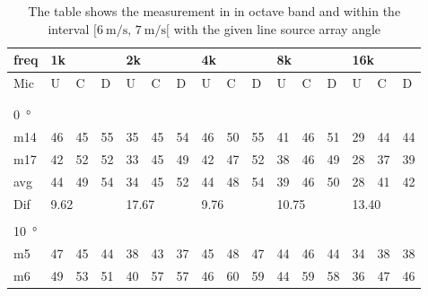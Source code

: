 \begin{table}[H]
\centering
\caption{The table shows the measurement in in octave band and within the interval $[\SI{6}{\meter\per\second},\, \SI{7}{\meter\per\second}[ $ with the given line source array angle}
\begin{tabular}{l|l|l|l|l|l|l|l|l|l|l|l|l|lll}
freq & \multicolumn{3}{l|}{1k} & \multicolumn{3}{l|}{2k} & \multicolumn{3}{l|}{4k} & \multicolumn{3}{l|}{8k} & \multicolumn{3}{l}{16k}                                \\ \hline
Mic  & U      & C      & D     & U      & C      & D     & U      & C      & D     & U      & C      & D     & \multicolumn{1}{l|}{U}  & \multicolumn{1}{l|}{C}  & D  \\ \hline
 & \multicolumn{3}{l|}{} & \multicolumn{3}{l|}{} & \multicolumn{3}{l|}{} & \multicolumn{3}{l|}{} & \multicolumn{3}{l}{}                                \\ 
 \multicolumn{16}{l}{ } \\   
\SI{0}{\degree}   & \multicolumn{3}{l|}{} & \multicolumn{3}{l|}{} & \multicolumn{3}{l|}{} & \multicolumn{3}{l|}{} & \multicolumn{3}{l}{}   \\  \hline
m14  & 46     & 45     & 55    & 35     & 45     & 54    & 46     & 50     & 55    & 41     & 46     & 51    & \multicolumn{1}{l|}{29} & \multicolumn{1}{l|}{44} & 44 \\
m17  & 42     & 52     & 52    & 33     & 45     & 49    & 42     & 47     & 52    & 38     & 46     & 49    & \multicolumn{1}{l|}{28} & \multicolumn{1}{l|}{37} & 39 \\ \hline
avg  &   44    &   49   & 54    &  34    &  45    &  52  &   44     &  48   &   54  &  39    & 46    &  50     & \multicolumn{1}{l|}{28}   & \multicolumn{1}{l|}{41}   & 42 \\ \hline  
Dif & \multicolumn{3}{l|}{9.62} & \multicolumn{3}{l|}{17.67} & \multicolumn{3}{l|}{9.76} & \multicolumn{3}{l|}{10.75} & \multicolumn{3}{l}{13.40}  \\ 
 \multicolumn{16}{l}{ } \\                             
\SI{10}{\degree}   & \multicolumn{3}{l|}{} & \multicolumn{3}{l|}{} & \multicolumn{3}{l|}{} & \multicolumn{3}{l|}{} & \multicolumn{3}{l}{}   \\  \hline
m5    & 47     & 45     & 44     &  38    & 43     &  37    &  45    & 48      &  47    &    44   &  46    &  44    & \multicolumn{1}{l|}{34} & \multicolumn{1}{l|}{38} & 38 \\ 
m6    & 49     &  53    &  51    &  40    &  57    &  57    & 46     &  60     &   59   &    44   &    59  &   58   & \multicolumn{1}{l|}{36} & \multicolumn{1}{l|}{47} &46  \\ 

\end{tabular}
\end{table}
